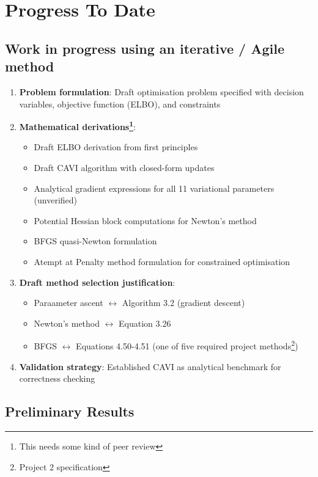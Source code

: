 \documentclass[11pt]{article}
\begin{document}
\section*{Progress To Date}

\subsection*{Work in progress using an iterative / Agile method}

\begin{enumerate}
\item \textbf{Problem formulation}: Draft optimisation problem specified with decision variables, objective function (ELBO), and constraints

\item \textbf{Mathematical derivations\footnote{This needs some kind of peer review}}:   
\begin{itemize}
\item Draft ELBO derivation from first principles
\item Draft CAVI algorithm with closed-form updates
\item Analytical gradient expressions for all 11 variational parameters (unverified) 
\item Potential Hessian block computations for Newton's method
\item BFGS quasi-Newton formulation
\item Atempt at Penalty method formulation for constrained optimisation
\end{itemize}

\item \textbf{Draft method selection justification}:  
\begin{itemize}
\item Paraameter ascent $\leftrightarrow$ Algorithm 3.2 (gradient descent)
\item Newton's method $\leftrightarrow$ Equation 3.26
\item BFGS $\leftrightarrow$ Equations 4.50-4.51 (one of five required project methods\footnote{Project 2 specification})
\end{itemize}

\item \textbf{Validation strategy}: Established CAVI as analytical benchmark for correctness checking
\end{enumerate}

\subsection*{Preliminary Results}
\end{document}

